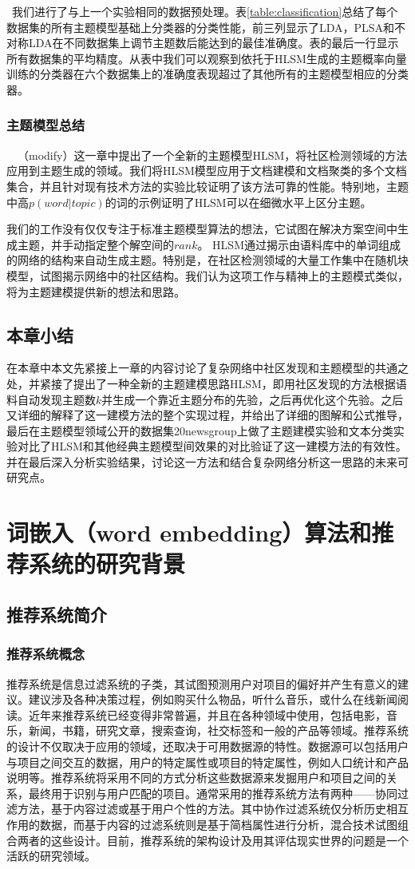  我们进行了与上一个实验相同的数据预处理。表\ref{table:classification}总结了每个数据集的所有主题模型基础上分类器的分类性能，前三列显示了LDA，PLSA和不对称LDA在不同数据集上调节主题数后能达到的最佳准确度。表的最后一行显示所有数据集的平均精度。从表中我们可以观察到依托于HLSM生成的主题概率向量训练的分类器在六个数据集上的准确度表现超过了其他所有的主题模型相应的分类器。
  \subsection{主题模型总结}
  （modify）这一章中提出了一个全新的主题模型HLSM，将社区检测领域的方法应用到主题生成的领域。我们将HLSM模型应用于文档建模和文档聚类的多个文档集合，并且针对现有技术方法的实验比较证明了该方法可靠的性能。特别地，主题中高$p(word|topic)$的词的示例证明了HLSM可以在细微水平上区分主题。

我们的工作没有仅仅专注于标准主题模型算法的想法，它试图在解决方案空间中生成主题，并手动指定整个解空间的$ rank $。 HLSM通过揭示由语料库中的单词组成的网络的结构来自动生成主题。特别是，在社区检测领域的大量工作集中在随机块模型，试图揭示网络中的社区结构。我们认为这项工作与精神上的主题模式类似，将为主题建模提供新的想法和思路。
\section{本章小结}
在本章中本文先紧接上一章的内容讨论了复杂网络中社区发现和主题模型的共通之处，并紧接了提出了一种全新的主题建模思路HLSM，即用社区发现的方法根据语料自动发现主题数$k$并生成一个靠近主题分布的先验，之后再优化这个先验。之后又详细的解释了这一建模方法的整个实现过程，并给出了详细的图解和公式推导，最后在主题模型领域公开的数据集20newsgroup上做了主题建模实验和文本分类实验对比了HLSM和其他经典主题模型间效果的对比验证了这一建模方法的有效性。并在最后深入分析实验结果，讨论这一方法和结合复杂网络分析这一思路的未来可研究点。
\chapter{词嵌入（word embedding）算法和推荐系统的研究背景}
\section{推荐系统简介}
\subsection{推荐系统概念}
推荐系统是信息过滤系统的子类，其试图预测用户对项目的偏好并产生有意义的建议。建议涉及各种决策过程，例如购买什么物品，听什么音乐，或什么在线新闻阅读\cite{rec1}。近年来推荐系统已经变得非常普遍，并且在各种领域中使用，包括电影，音乐，新闻，书籍，研究文章，搜索查询，社交标签和一般的产品等领域。推荐系统的设计不仅取决于应用的领域，还取决于可用数据源的特性。数据源可以包括用户与项目之间交互的数据，用户的特定属性或项目的特定属性，例如人口统计和产品说明等。推荐系统将采用不同的方式分析这些数据源来发掘用户和项目之间的关系，最终用于识别与用户匹配的项目\cite{rec2}。通常采用的推荐系统方法有两种——协同过滤方法，基于内容过滤或基于用户个性的方法\cite{rec3}。其中协作过滤系统仅分析历史相互作用的数据，而基于内容的过滤系统则是基于简档属性进行分析，混合技术试图组合两者的这些设计。目前，推荐系统的架构设计及用其评估现实世界的问题是一个活跃的研究领域。
